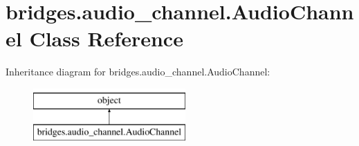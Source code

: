 \hypertarget{classbridges_1_1audio__channel_1_1_audio_channel}{}\section{bridges.\+audio\+\_\+channel.\+Audio\+Channel Class Reference}
\label{classbridges_1_1audio__channel_1_1_audio_channel}
Inheritance diagram for bridges.\+audio\+\_\+channel.\+Audio\+Channel\+:\begin{figure}[H]
\begin{center}
\leavevmode
\includegraphics[height=2.000000cm]{classbridges_1_1audio__channel_1_1_audio_channel}
\end{center}
\end{figure}
